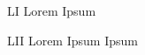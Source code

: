 \begin{KeepFromToc} %
\listoffigures
\cleardoublepage


\listoftables
\cleardoublepage

\listofquadros*
\cleardoublepage

\makeatletter
\let\l@listing\l@figure
\def\newfloat@listoflisting@hook{\let\figurename\listingname}
\makeatother

\listoflistings

\end{KeepFromToc}

\begin{siglas}
	\item[LI]       Lorem Ipsum
    \item[LII]		Lorem Ipsum Ipsum

\end{siglas}

\tableofcontents*
\cleardoublepage


